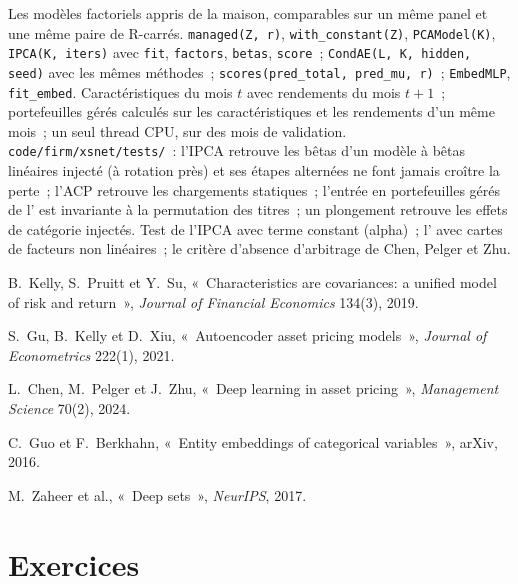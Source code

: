 \begin{build}
 Les modèles factoriels appris de la maison, comparables sur un même panel et une même paire de R-carrés.
 \texttt{managed(Z, r)}, \texttt{with\_constant(Z)}, \texttt{PCAModel(K)}, \texttt{IPCA(K, iters)}
avec \texttt{fit}, \texttt{factors}, \texttt{betas}, \texttt{score}~; \texttt{CondAE(L, K, hidden, seed)} avec les mêmes
méthodes~; \texttt{scores(pred\_total, pred\_mu, r)}~; \texttt{EmbedMLP}, \texttt{fit\_embed}.
 Caractéristiques du mois $t$ avec rendements du mois $t+1$~; portefeuilles gérés calculés sur les caractéristiques et les
rendements d'un même mois~; un seul thread CPU,  sur des mois de validation.
 \texttt{code/firm/xsnet/tests/}~: l'IPCA retrouve les bêtas d'un modèle à bêtas linéaires injecté (à rotation près)
et ses étapes alternées ne font jamais croître la perte~; l'ACP retrouve les chargements statiques~; l'entrée en portefeuilles gérés
de l' est invariante à la permutation des titres~; un plongement retrouve les effets de catégorie injectés.
 Test de l'IPCA avec terme constant (alpha)~; l' avec cartes de facteurs non linéaires~; le critère
d'absence d'arbitrage de Chen, Pelger et Zhu.
\end{build}

\begin{omsources}
\item B.~Kelly, S.~Pruitt et Y.~Su, «~Characteristics are covariances: a unified model of risk and return~», \emph{Journal
of Financial Economics} 134(3), 2019.
\item S.~Gu, B.~Kelly et D.~Xiu, «~Autoencoder asset pricing models~», \emph{Journal of Econometrics} 222(1), 2021.
\item L.~Chen, M.~Pelger et J.~Zhu, «~Deep learning in asset pricing~», \emph{Management Science} 70(2), 2024.
\item C.~Guo et F.~Berkhahn, «~Entity embeddings of categorical variables~», arXiv, 2016.
\item M.~Zaheer et al., «~Deep sets~», \emph{NeurIPS}, 2017.
\end{omsources}

\section{Exercices}

